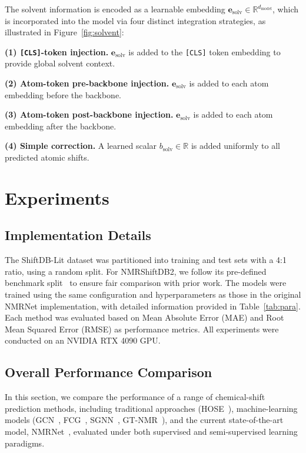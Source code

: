 The solvent information is encoded as a learnable embedding $\mathbf{e}_{\text{solv}} \in \mathbb{R}^{d_{\text{model}}}$, which is incorporated into the model via four distinct integration strategies, as illustrated in Figure~\ref{fig:solvent}:

\textbf{(1) \texttt{[CLS]}-token injection.}
$\mathbf{e}_{\text{solv}}$ is added to the \texttt{[CLS]} token embedding to provide global solvent context.

\textbf{(2) Atom-token pre-backbone injection.}
$\mathbf{e}_{\text{solv}}$ is added to each atom embedding before the backbone.

\textbf{(3) Atom-token post-backbone injection.}
$\mathbf{e}_{\text{solv}}$ is added to each atom embedding after the backbone.

\textbf{(4) Simple correction.}
A learned scalar $b_{\text{solv}} \in \mathbb{R}$ is added uniformly to all predicted atomic shifts.


\section{Experiments}

\subsection{Implementation Details}

The ShiftDB-Lit dataset was partitioned into training and test sets with a 4:1 ratio, using a random split.
For NMRShiftDB2, we follow its pre-defined benchmark split~\cite{kuhn2015NMRShiftDB2} to ensure fair comparison with prior work. 
The models were trained using the same configuration and hyperparameters as those in the original NMRNet implementation, with detailed information provided in Table~\ref{tab:para}. Each method was evaluated based on Mean Absolute Error (MAE) and Root Mean Squared Error (RMSE) as performance metrics. All experiments were conducted on an NVIDIA RTX 4090 GPU.


\subsection{Overall Performance Comparison}

In this section, we compare the performance of a range of chemical-shift
prediction methods, including traditional approaches (HOSE~\cite{bremser1978hose}),
machine-learning models (GCN~\cite{jonas2019rapid},
FCG~\cite{kwon2020FCG}, SGNN~\cite{han2022SGNN}, GT-NMR~\cite{chen2024gt}),
and the current state-of-the-art model, NMRNet~\cite{xu2025toward}, evaluated
under both supervised and semi-supervised learning paradigms.

